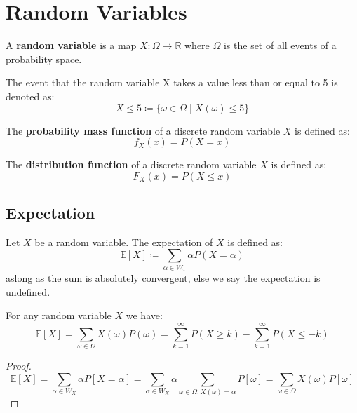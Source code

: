 \section{Random Variables}

\begin{definition}
    A \textbf{random variable } is a map $X: \Omega \to \mathbb{R}$ where $\Omega$ is the set of all events of a probability space.
\end{definition}

\begin{example}
    The event that the random variable X takes a value less than or equal to 5 is denoted as:
    $$X \leq 5 \coloneqq \{\omega \in \Omega \mid X(\omega) \leq 5\}$$
\end{example}

\begin{definition}
    The \textbf{probability mass function} of a discrete random variable $X$ is defined as:
    $$f_X(x) = P(X=x)$$
\end{definition}

\begin{definition}
    The \textbf{distribution function} of a discrete random variable $X$ is defined as:
    $$F_X(x) = P(X \leq x)$$
\end{definition}

\subsection{Expectation}

\begin{definition}
    Let $X$ be a random variable. The expectation of $X$ is defined as:
    $$
    \mathbb{E}[X] \coloneqq \sum_{\alpha \in W_x} \alpha P(X=\alpha)
    $$
    aslong as the sum is absolutely convergent, else we say the expectation is undefined.
\end{definition}

\begin{lemma}
    For any random variable $X$ we have:
    $$ \mathbb{E}[X] = \sum_{\omega \in \Omega} X(\omega) P(\omega) = \sum_{k=1}^\infty P(X \geq k) - \sum_{k=1}^\infty P(X \leq -k) $$
\end{lemma}

\begin{proof}
    $$\mathbb{E}[X] = \sum_{\alpha \in W_X}\alpha P[X=\alpha] = \sum_{\alpha \in W_X}\alpha\sum_{\omega \in \Omega, X(\omega)=\alpha} P[\omega] = \sum_{\omega \in \Omega} X(\omega) P[\omega]$$
\end{proof}

